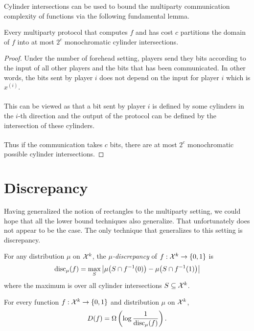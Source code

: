 Cylinder intersections can be used to bound the multiparty communication complexity of functions via the following fundamental lemma.

\begin{lemma}
	Every multiparty protocol that computes $f$ and has cost $c$ partitions the domain of $f$ into at most $2^c$ monochromatic cylinder intersections.
\end{lemma}

\begin{proof}
	Under the number of forehead setting, players send they bits according to the input of all other players and the bits that has been communicated. In other words, the bits sent by player $i$ does not depend on the input for player $i$ which is $x^{(i)}$.\\
	\\
	This can be viewed as that a bit sent by player $i$ is defined by some cylinders in the $i$-th direction and the output of the protocol can be defined by the intersection of these cylinders.\\
	\\
	Thus if the communication takes $c$ bits, there are at most $2^c$ monochromatic possible cylinder intersections.
\end{proof}




\section{Discrepancy}

Having generalized the notion of rectangles to the multiparty setting, we could hope that all the lower bound techniques also generalize. That unfortunately does not appear to be the case. The only technique that generalizes to this setting is discrepancy.

\begin{definition}
	For any distribution $\mu$ on $\mathcal{X}^k$, 
	the \emph{$\mu$-discrepancy} of $f : \mathcal{X}^k \to \{0,1\}$ is
	\[
	\mathrm{disc}_\mu(f) = \max_{S} 
	\left| \mu\big( S \cap f^{-1}(0) \big) - \mu\big( S \cap f^{-1}(1)\big) \right|
	\]
	where the maximum is over all cylinder intersections $S \subseteq \mathcal{X}^k$.
\end{definition}


\begin{lemma}
	For every function $f : \mathcal{X}^k \to \{0,1\}$ and distribution $\mu$ on $\mathcal{X}^k$,
	\[
	D(f) = \Omega\left( \log \frac{1}{\mathrm{disc}_\mu(f)}\right).
	\]
\end{lemma}

